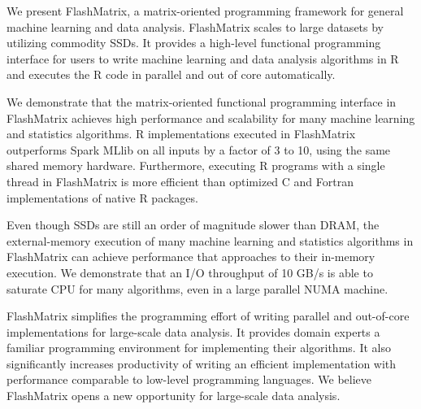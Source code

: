 We present FlashMatrix, a matrix-oriented programming framework for general
machine learning and data analysis. FlashMatrix scales to large datasets by
utilizing commodity SSDs. It provides a high-level functional programming
interface for users to write machine learning and data analysis algorithms
in R and executes the R code in parallel and out of core automatically.

We demonstrate that the matrix-oriented functional programming interface in
FlashMatrix achieves high performance and scalability for many machine learning and 
statistics algorithms.  R implementations executed in FlashMatrix outperforms
Spark MLlib on all inputs by a factor of 3 to 10, using the same shared memory hardware.
Furthermore, executing R programs with a single thread in FlashMatrix is more
efficient than optimized C and Fortran implementations of native R packages.


Even though SSDs are still an order of magnitude slower than DRAM, the external-memory
execution of many machine learning and statistics algorithms in FlashMatrix can achieve performance
that approaches to their in-memory execution. We demonstrate that an I/O throughput
of 10 GB/s is able to saturate CPU for many algorithms, even in a large parallel
NUMA machine. 

FlashMatrix simplifies the programming effort of writing
parallel and out-of-core implementations for large-scale data analysis. It
provides domain experts a familiar programming environment for implementing
their algorithms. It also significantly
increases productivity of writing an efficient implementation with performance
comparable to low-level programming languages. We believe FlashMatrix opens
a new opportunity for large-scale data analysis.
